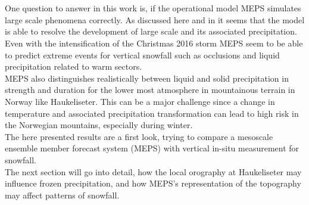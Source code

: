 \\
\\
One question to answer in this work is, if the operational model MEPS simulates large scale phenomena correctly. As discussed here and in  it seems that the model is able to resolve the development of large scale and its associated precipitation. Even with the intensification of the Christmas 2016 storm MEPS seem to be able to predict extreme events for vertical snowfall such as occlusions and liquid precipitation related to warm sectors. %
\\
MEPS also distinguishes realistically between liquid and solid precipitation in strength and duration for the lower most atmosphere in mountainous terrain in Norway like Haukeliseter.
This can be a major challenge since a change in temperature and associated precipitation transformation can lead to high risk in the Norwegian mountains, especially during winter. 
\\
The here presented results are a first look, trying to compare a mesoscale ensemble member forecast system (MEPS) with vertical in-situ measurement for snowfall.
\\
The next section will go into detail, how the local orography at Haukeliseter may influence frozen precipitation, and how MEPS's representation of the topography may affect patterns of snowfall. 


